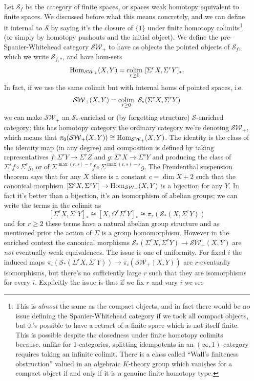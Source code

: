 Let \(\mathcal{S}_{f}\) be the category of finite spaces, or spaces weak homotopy equivalent to finite spaces. We discussed before what this means concretely, and we can define it internal to \(\mathcal{S}\) by saying it's the closure of \(\{1\}\) under finite homotopy colimits\footnote{This is \emph{almost} the same as the compact objects, and in fact there would be no issue defining the Spanier-Whitehead category if we took all compact objects, but it's possible to have a retract of a finite space which is not itself finite. This is possible despite the closedness under finite homotopy colimits because, unlike for \(1\)-categories, splitting idempotents in an \((\infty, 1)\)-category requires taking an infinite colimit. There is a class called ``Wall's finiteness obstruction'' valued in an algebraic \(K\)-theory group which vanishes for a compact object if and only if it is a genuine finite homotopy type.} (or simply by homotopy pushouts and the initial object). We define the pre-Spanier-Whitehead category \(\mathcal{SW}_+\) to have as objects the pointed objects of \(\mathcal{S}_f\), which we write \(\mathcal{S}_{f,*}\), and have hom-sets \[\operatorname{Hom}_{\mathcal{SW}_+}(X, Y) = \operatorname*{colim}\limits_{r \geq 0}\ [\Sigma^r X, \Sigma^r Y]_*.\]In fact, if we use the same colimit but with internal homs of pointed spaces, i.e.~\[\mathcal{SW}_+(X, Y) = \operatorname*{colim}\limits_{r \geq 0}\ \mathcal{S}_*(\Sigma^r X, \Sigma^r Y)\]we can make \(\mathcal{SW}_+\) an \(\mathcal{S}_*\)-enriched or (by forgetting structure) \(\mathcal{S}\)-enriched category; this has homotopy category the ordinary category we're denoting \(\mathcal{SW}_+\), which means that \(\pi_0(\mathcal{SW}_+(X, Y)) \cong \operatorname{Hom}_{\mathcal{SW}_+}(X, Y)\). The identity is the class of the identity map (in any degree) and composition is defined by taking representatives \(f : \Sigma^r Y \to \Sigma^r Z\) and \(g : \Sigma^s X \to \Sigma^s Y\) and producing the class of \(\Sigma^s f \circ \Sigma^r g\), or of \(\Sigma^{\max(r, s) - r} f \circ \Sigma^{\max(r, s) - s} g\). The Freudenthal suspension theorem says that for any \(X\) there is a constant \(c = \dim X + 2\) such that the canonical morphism \([\Sigma^c X, \Sigma^c Y] \to \operatorname{Hom}_{\mathcal{SW}_+}(X, Y)\) is a bijection for any \(Y\). In fact it's better than a bijection, it's an isomorphism of abelian groups; we can write the terms in the colimit as \[[\Sigma^r X, \Sigma^r Y]_* \cong [X, \Omega^r \Sigma^r Y]_* \cong \pi_r(\mathcal{S}_*(X, \Sigma^r Y))\]and for \(r \geq 2\) these terms have a natural abelian group structure and as mentioned prior the action of \(\Sigma\) is a group homomorphism. However in the enriched context the canonical morphisms \(\mathcal{S}_*(\Sigma^r X, \Sigma^r Y) \to \mathcal{SW}_+(X, Y)\) are \emph{not} eventually weak equivalences. The issue is one of uniformity. For fixed \(i\) the induced maps \(\pi_i(\mathcal{S}_*(\Sigma^r X, \Sigma^r Y)) \to \pi_i(\mathcal{SW}_+(X, Y))\) are \(r\)-eventually isomorphisms, but there's no sufficiently large \(r\) such that they are isomorphisms for every \(i\). Explicitly the issue is that if we fix \(r\) and vary \(i\) we see
